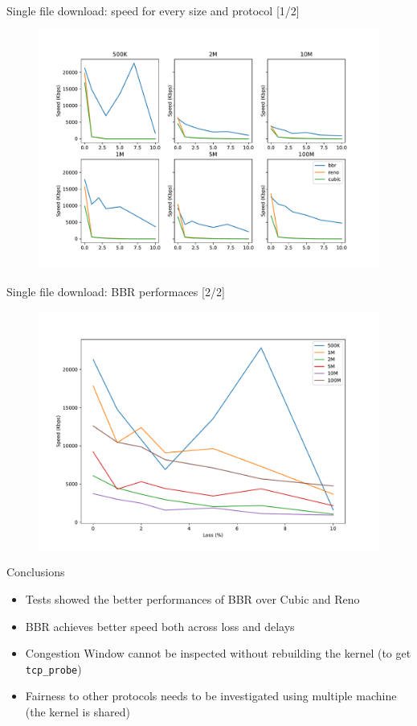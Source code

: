 \documentclass[13pt,aspectratio=43]{beamer}
\begin{document}
\begin{frame}{Single file download: speed for every size and protocol [1/2]}
  \begin{figure}
	  \includegraphics[width=\textwidth,height=\textheight,keepaspectratio]{../http_single_test/sizes_plot.pdf}
  \end{figure}
\end{frame}

\begin{frame}{Single file download: BBR performaces [2/2]}
  \begin{figure}
	  \includegraphics[width=\textwidth,height=\textheight,keepaspectratio]{../http_single_test/size_bbr_plot.pdf}
  \end{figure}
\end{frame}


\begin{frame}{Conclusions}
	\begin{itemize}
		\item Tests showed the better performances of BBR over Cubic and Reno
		\item BBR achieves better speed both across loss and delays
		\item Congestion Window cannot be inspected without rebuilding the kernel (to get \texttt{tcp\_probe})
		\item Fairness to other protocols needs to be investigated using multiple machine (the kernel is shared)
	\end{itemize}
\end{frame}
\end{document}
